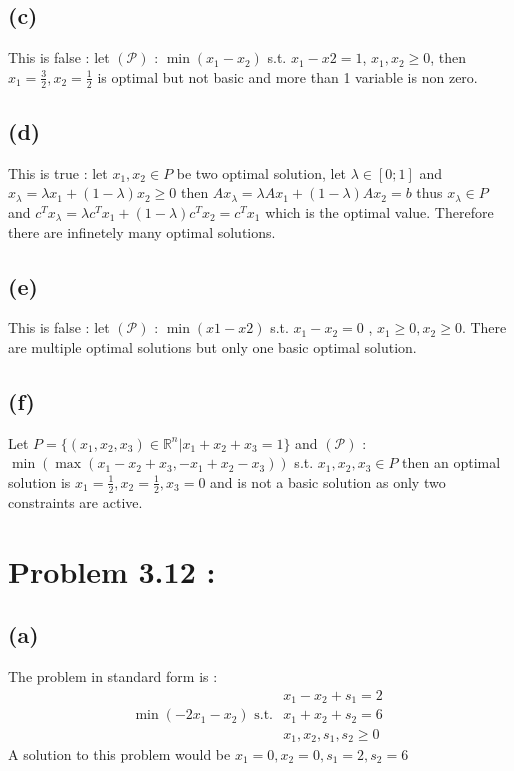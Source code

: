 \documentclass{article}
\begin{document}
\subsection*{(c)}
This is false : let $(\mathcal{P})$ : $\min(x_1-x_2)$ s.t. $x_1-x2 = 1$, $x_1,x_2 \ge 0$, then $x_1 = \frac{3}{2}, x_2 = \frac{1}{2}$ is optimal but not basic and more than 1 variable is non zero.
\subsection*{(d)}
This is true : let $x_1, x_2\in P$ be two optimal solution, let $\lambda\in [0;1]$ and $x_\lambda = \lambda x_1 + (1- \lambda)x_2 \ge 0$ then $ Ax_\lambda = \lambda Ax_1 + (1- \lambda)Ax_2 = b$ thus $x_\lambda\in P$ and $c^Tx_\lambda = \lambda c^Tx_1 + (1- \lambda)c^Tx_2 = c^Tx_1$ which is the optimal value.
Therefore there are infinetely many optimal solutions.
\subsection*{(e)}
This is false : let $(\mathcal{P})$ : $\min(x1-x2)$ s.t. $x_1-x_2 = 0$ , $x_1\ge 0, x_2\ge 0$. There are multiple optimal solutions but only one basic optimal solution.
\subsection*{(f)}
Let $P=\{(x_1,x_2,x_3)\in\mathbb{R}^n | x_1+x_2+x_3 = 1\}$ and $(\mathcal{P})$ : $\min(\max(x_1-x_2+x_3,-x_1+x_2-x_3))$ s.t. $x_1,x_2,x_3\in P$ then an optimal solution is $x_1 = \frac{1}{2}, x_2 = \frac{1}{2},x_3 = 0$ and is not a basic solution as only two constraints are active.

\section*{Problem 3.12 :}
\subsection*{(a)}
The problem in standard form is  : $$\boxed{\min(-2x_1-x_2) \text{ s.t. } \begin{array}{c}
    x_1-x_2+s_1 = 2\\
    x_1+x_2+s_2 = 6\\
    x_1,x_2,s_1,s_2\ge 0
\end{array}}$$
A solution to this problem would be $x_1 = 0,x_2 = 0, s_1 = 2, s_2 = 6$
\end{document}
